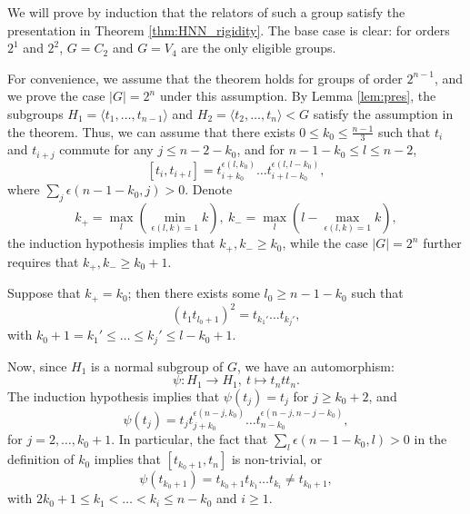 \documentclass[12pt,leqno]{amsart}
\makeatletter
\renewenvironment{proof}[1][\proofname]{%
	\par
	\pushQED{\qed}%
	\normalfont
	\topsep6\p@\@plus6\p@\relax
	\trivlist
	\item[\hskip\labelsep\itshape #1\@addpunct{.}]%
	\ignorespaces
}{%
	\par\nobreak\vspace{2pt}%
	\popQED%
	\medskip%
	\endtrivlist
	\@endpefalse
}
\newcommand{\2}{L^2_{\rm per}(0, T)}
\numberwithin{equation}{section}
\numberwithin{figure}{section}
\makeatother
\begin{document}
\begin{proof}[Proof of Theorem \ref{thm:HNN_rigidity}]
    We will prove by induction that the relators of such a group satisfy the presentation in Theorem \ref{thm:HNN_rigidity}. The base case is clear: for orders $2^1$ and $2^2$, $G = C_2$ and $G = V_4$ are the only eligible groups.
    
    For convenience, we assume that the theorem holds for groups of order $2^{n-1}$, and we prove the case $\lvert G\rvert = 2^n$ under this assumption. By Lemma \ref{lem:pres}, the subgroups $H_1 = \langle t_1,\dots, t_{n-1}\rangle$ and $H_2 = \langle t_2,\dots, t_n\rangle < G$ satisfy the assumption in the theorem. Thus, we can assume that there exists $0\leq k_0\leq \frac{n-1}{3}$ such that $t_i$ and $t_{i+j}$ commute for any $j\leq n-2-k_0$, and for $n-1-k_0\leq l\leq n-2$,
    \[
    [t_i,t_{i+l}] = t_{i+k_0}^{\epsilon(l,k_0)}\dots t_{i+l-k_0}^{\epsilon(l,l-k_0)},
    \]
    where $\sum_j\epsilon(n-1-k_0,j)>0$. Denote
    \[
    k_+ = \max_l(\min_{\epsilon(l,k)=1}k),\ k_- = \max_l(l - \max_{\epsilon(l,k) = 1} k),
    \]
    the induction hypothesis implies that $k_+,k_-\geq k_0$, while the case $\lvert G\rvert = 2^n$ further requires that $k_+,k_-\geq k_0+1$.
    
    Suppose that $k_+ = k_0$; then there exists some $l_0\geq n-1-k_0$ such that
    \[
    (t_1t_{l_0+1})^2 = t_{k_1'}\dots t_{k_j'},
    \]
    with $k_0+1=k_1'\leq\dots\leq k_j'\leq l-k_0+1$.
    
    Now, since $H_1$ is a normal subgroup of $G$, we have an automorphism:
    \[
    \psi:H_1\to H_1,\ t\mapsto t_ntt_n.
    \]
    The induction hypothesis implies that $\psi(t_j) = t_j$ for $j\geq k_0+2$, and
    \[
    \psi(t_j) = t_j t_{j+k_0}^{\epsilon(n-j,k_0)}\dots t_{n-k_0}^{\epsilon(n-j,n-j-k_0)},
    \]
    for $j=2,\dots, k_0+1$. In particular, the fact that $\sum_l\epsilon(n-1-k_0,l)>0$ in the definition of $k_0$ implies that $[t_{k_0+1},t_n]$ is non-trivial, or
    \[
    \psi(t_{k_0+1}) = t_{k_0+1}t_{k_1}\dots t_{k_i} \neq t_{k_0+1},
    \]
    with $2k_0+1\leq k_1<\dots< k_i\leq n-k_0$ and $i\geq 1$.
    

\end{proof}
\end{document}
